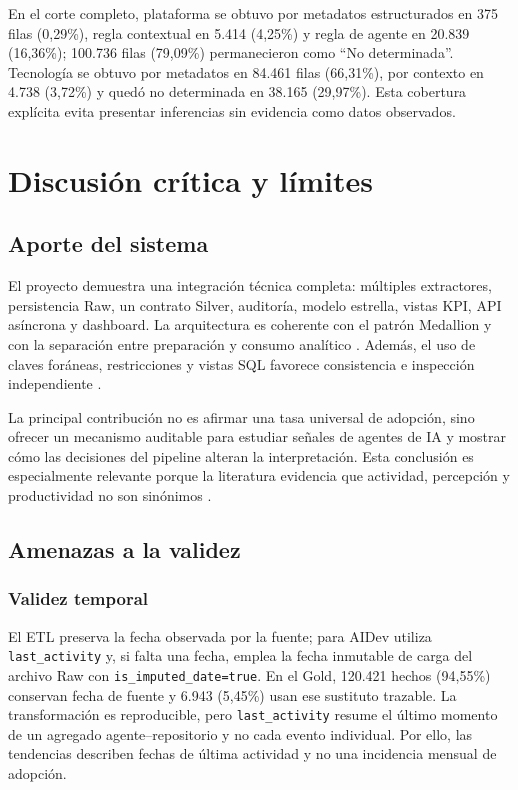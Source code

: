 \documentclass[12pt,a4paper]{article}
\newcommand{\pathcode}[1]{\begingroup\small\ttfamily\nolinkurl{#1}\endgroup}
\begin{document}
En el corte completo, plataforma se obtuvo por metadatos estructurados en 375 filas (0,29\%), regla contextual en 5.414 (4,25\%) y regla de agente en 20.839 (16,36\%); 100.736 filas (79,09\%) permanecieron como ``No determinada''. Tecnología se obtuvo por metadatos en 84.461 filas (66,31\%), por contexto en 4.738 (3,72\%) y quedó no determinada en 38.165 (29,97\%). Esta cobertura explícita evita presentar inferencias sin evidencia como datos observados.

\section{Discusión crítica y límites}

\subsection{Aporte del sistema}

El proyecto demuestra una integración técnica completa: múltiples extractores, persistencia Raw, un contrato Silver, auditoría, modelo estrella, vistas KPI, API asíncrona y dashboard. La arquitectura es coherente con el patrón Medallion y con la separación entre preparación y consumo analítico \cite{databricks_medallion}. Además, el uso de claves foráneas, restricciones y vistas SQL favorece consistencia e inspección independiente \cite{postgres_constraints}.

La principal contribución no es afirmar una tasa universal de adopción, sino ofrecer un mecanismo auditable para estudiar señales de agentes de IA y mostrar cómo las decisiones del pipeline alteran la interpretación. Esta conclusión es especialmente relevante porque la literatura evidencia que actividad, percepción y productividad no son sinónimos \cite{peng_copilot,stray_copilot}.

\subsection{Amenazas a la validez}

\subsubsection{Validez temporal}

El ETL preserva la fecha observada por la fuente; para AIDev utiliza \pathcode{last_activity} y, si falta una fecha, emplea la fecha inmutable de carga del archivo Raw con \pathcode{is_imputed_date=true}. En el Gold, 120.421 hechos (94,55\%) conservan fecha de fuente y 6.943 (5,45\%) usan ese sustituto trazable. La transformación es reproducible, pero \pathcode{last_activity} resume el último momento de un agregado agente--repositorio y no cada evento individual. Por ello, las tendencias describen fechas de última actividad y no una incidencia mensual de adopción.
\end{document}
